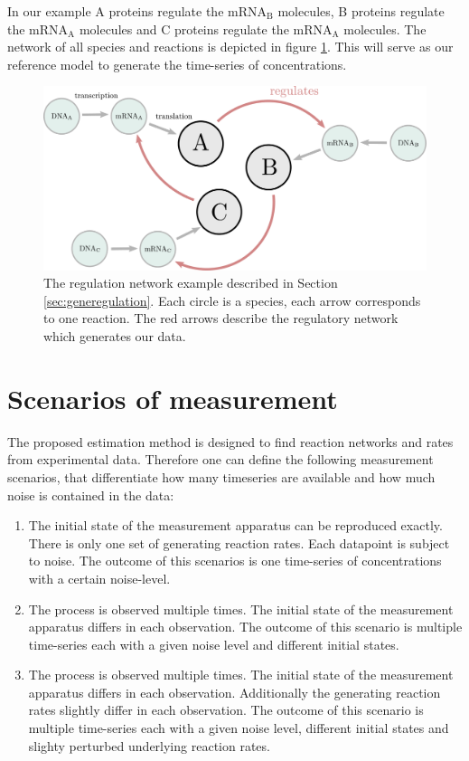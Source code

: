 \documentclass[oneside, abstracton, titlepage]{scrartcl}
\begin{document}
    In our example A proteins regulate the mRNA$_\mathrm{B}$ molecules, B proteins regulate the mRNA$_\mathrm{A}$ molecules and C proteins regulate the mRNA$_\mathrm{A}$ molecules. The network of all species and reactions is depicted in figure \ref{fig:network}. This will serve as our reference model to generate the time-series of concentrations.
    \begin{figure}
        \centering
        \includegraphics[width=.5\textwidth]{./figures_tex/gene_regulation_full.pdf}
        \caption{The regulation network example described in Section \ref{sec:generegulation}. Each circle is a species, each arrow corresponds to one reaction. The red arrows describe the regulatory network which generates our data.}
        \label{fig:network}
    \end{figure}


    \section{Scenarios of measurement}

    The proposed estimation method is designed to find reaction networks and rates from experimental data. Therefore one can define the following measurement scenarios, that differentiate how many timeseries are available and how much noise is contained in the data:
    \begin{enumerate}
        \item The initial state of the measurement apparatus can be reproduced exactly. There is only one set of generating reaction rates. Each datapoint is subject to noise. The outcome of this scenarios is one time-series of concentrations with a certain noise-level.
        \item The process is observed multiple times. The initial state of the measurement apparatus differs in each observation. The outcome of this scenario is multiple time-series each with a given noise level and different initial states.
        \item The process is observed multiple times. The initial state of the measurement apparatus differs in each observation. Additionally the generating reaction rates slightly differ in each observation. The outcome of this scenario is multiple time-series each with a given noise level, different initial states and slighty perturbed underlying reaction rates.
    \end{enumerate}
\end{document}
